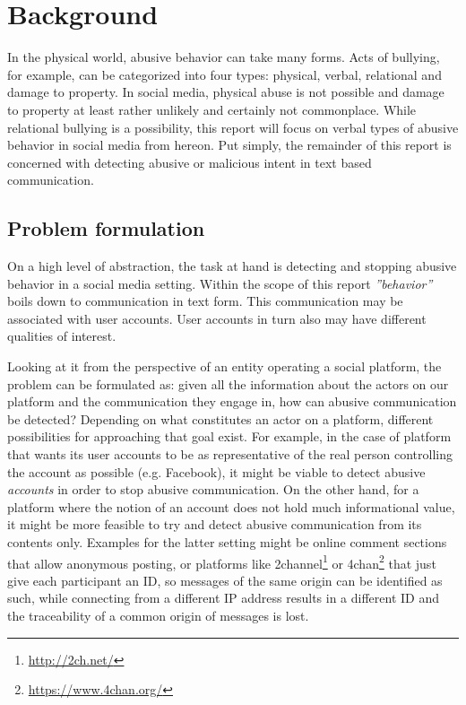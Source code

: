 \documentclass{proseminar}
\begin{document}
\section{Background}
In the physical world, abusive behavior can take many forms. Acts of bullying, for example, can be categorized into four types: physical, verbal, relational and damage to property\cite{bullying:2014}. In social media, physical abuse is not possible and damage to property at least rather unlikely and certainly not commonplace. While relational bullying is a possibility, this report will focus on verbal types of abusive behavior in social media from hereon. Put simply, the remainder of this report is concerned with detecting abusive or malicious intent in text based communication.

\subsection{Problem formulation}
On a high level of abstraction, the task at hand is detecting and stopping abusive behavior in a social media setting. Within the scope of this report \emph{''behavior''} boils down to communication in text form. This communication may be associated with user accounts. User accounts in turn also may have different qualities of interest.

Looking at it from the perspective of an entity operating a social platform, the problem can be formulated as: given all the information about the actors on our platform and the communication they engage in, how can abusive communication be detected? Depending on what constitutes an actor on a platform, different possibilities for approaching that goal exist. For example, in the case of platform that wants its user accounts to be as representative of the real person controlling the account as possible (e.g. Facebook), it might be viable to detect abusive \emph{accounts} in order to stop abusive communication. On the other hand, for a platform where the notion of an account does not hold much informational value, it might be more feasible to try and detect abusive communication from its contents only. Examples for the latter setting might be online comment sections that allow anonymous posting, or platforms like 2channel\footnote{\url{http://2ch.net/}} or 4chan\footnote{\url{https://www.4chan.org/}} that just give each participant an ID, so messages of the same origin can be identified as such, while connecting from a different IP address results in a different ID and the traceability of a common origin of messages is lost.
\end{document}
